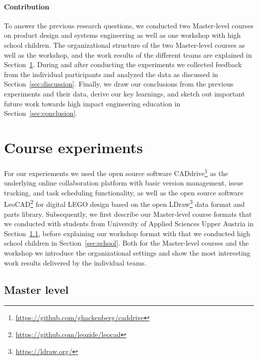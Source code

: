 \documentclass{PDS}
\begin{document}
\paragraph{Contribution}

To answer the previous research questions, we conducted two Master-level courses on product design and systems engineering as well as one workshop with high school children.
The organizational structure of the two Master-level courses as well as the workshop, and the work results of the different teams are explained in Section~\ref{sec:contribution}.
During and after conducting the experiments we collected feedback from the individual participants and analyzed the data as discussed in Section~\ref{sec:discussion}.
Finally, we draw our conclusions from the previous experiments and their data, derive our key learnings, and sketch out important future work towards high impact engineering education in Section~\ref{sec:conclusion}.

\section{Course experiments}
\label{sec:contribution}

For our experiements we used the open source software CADdrive\footnote{\url{https://github.com/ghackenberg/caddrive}} as the underlying online collaboration platform with basic version management, issue tracking, and task scheduling functionality, as well as the open source software LeoCAD\footnote{\url{https://github.com/leozide/leocad}} for digital LEGO design based on the open LDraw\footnote{\url{https://ldraw.org/}} data format and parts library.
Subsequently, we first describe our Master-level course formats that we conducted with students from University of Applied Sciences Upper Austria in Section~\ref{sec:master}, before explaining our workshop format with that we conducted high school children in Section~\ref{sec:school}.
Both for the Master-level courses and the workshop we introduce the organizational settings and show the most interesting work results delivered by the individual teams.

\subsection{Master level}
\label{sec:master}
\end{document}
